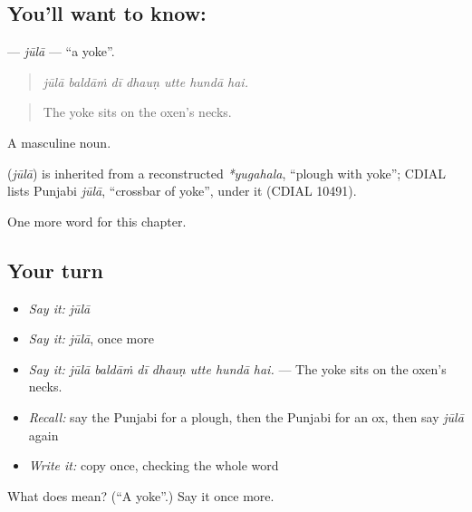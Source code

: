 \subsection*{You'll want to know: }
\textbf{} — \emph{jūlā} — \textquotedblleft{}a yoke\textquotedblright{}.

\begin{quote}
      
\end{quote}

\begin{quote}
\emph{jūlā baldāṁ dī dhauṇ utte hundā hai.}
\end{quote}

\begin{quote}
The yoke sits on the oxen's necks.
\end{quote}

A masculine noun.

\begin{cousinweb}
\textbf{} (\emph{jūlā}) is inherited from a reconstructed \emph{*yugahala}, \textquotedblleft{}plough with yoke\textquotedblright{}; CDIAL lists Punjabi \emph{jūlā}, \textquotedblleft{}crossbar of yoke\textquotedblright{}, under it (CDIAL 10491).
\end{cousinweb}

\begin{grammarlens}[title={What you've built}]
One more word for this chapter.
\end{grammarlens}

\subsection*{Your turn}
\begin{itemize}
\raggedright
  \item \emph{Say it:} \emph{jūlā}
  \item \emph{Say it:} \emph{jūlā}, once more
  \item \emph{Say it:} \emph{jūlā baldāṁ dī dhauṇ utte hundā hai.} — The yoke sits on the oxen's necks.
  \item \emph{Recall:} say the Punjabi for a plough, then the Punjabi for an ox, then say \emph{jūlā} again
  \item \emph{Write it:} copy \textbf{} once, checking the whole word
\end{itemize}

\begin{tcolorbox}[breakable,colback=teal!4,colframe=teal!35!black,title={Before you move on}]
What does  mean? (\textquotedblleft{}A yoke\textquotedblright{}.) Say it once more.
\end{tcolorbox}
